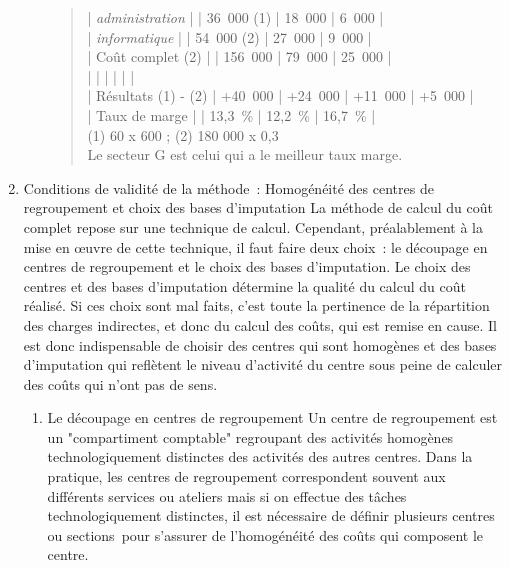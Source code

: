 \documentclass{tufte-handout}
\begin{document}
\begin{enumerate}
\begin{enumerate}
\begin{verse}
| \emph{administration}              |         | 36 000 (1) | 18 000    | 6 000     |\\
| \emph{informatique}                |         | 54 000 (2) | 27 000    | 9 000     |\\
| Coût complet (2)              |         | 156 000    | 79 000    | 25 000    |\\
|                               |         |            |           |           |\\
| Résultats (1) - (2)           | +40 000 | +24 000    | +11 000   | +5 000    |\\
| Taux de marge                 |         | 13,3 \%     | 12,2 \%    | 16,7 \%      |\\
(1) 60 x 600 ; (2) 180 000 x 0,3\\
Le secteur G est celui qui a le meilleur taux marge.\\
\end{verse}
\end{enumerate}

\item Conditions de validité de la méthode : Homogénéité des centres de regroupement et choix des bases d'imputation
\label{sec:org60ddedb}
La méthode de calcul du coût complet repose sur une technique de calcul. Cependant, préalablement à la mise en œuvre de cette technique, il faut faire deux choix : le découpage en centres de regroupement et le choix des bases d'imputation. Le choix des centres et des bases d'imputation détermine la qualité du calcul du coût réalisé. Si ces choix sont mal faits, c'est toute la pertinence de la répartition des charges indirectes, et donc du calcul des coûts, qui est remise en cause. Il est donc indispensable de choisir des centres qui sont homogènes et des bases d'imputation qui reflètent le niveau d'activité du centre sous peine de calculer des coûts qui n'ont pas de sens.\\

\begin{enumerate}
\item Le découpage en centres de regroupement
\label{sec:orgd0a141f}
Un centre de regroupement est un "compartiment comptable" regroupant des activités homogènes technologiquement distinctes des activités des autres centres. Dans la pratique, les centres de regroupement correspondent souvent aux différents services ou ateliers mais si on effectue des tâches technologiquement distinctes, il est nécessaire de définir plusieurs centres ou sections pour s'assurer de l'homogénéité des coûts qui composent le centre.\\


\end{enumerate}
\end{enumerate}
\end{document}
